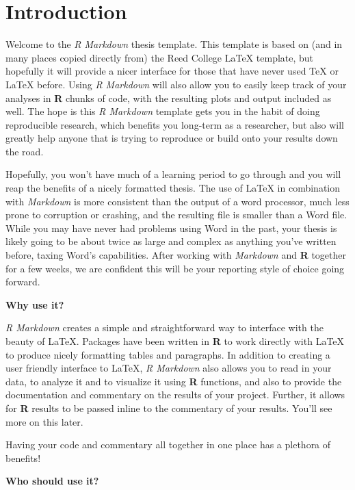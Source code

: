 \documentclass[12pt,twoside]{dukestatscithesis}
\theoremstyle{definition}
\theoremstyle{definition}
\theoremstyle{definition}
\theoremstyle{remark}
\begin{document}
\chapter*{Introduction}\label{introduction}

Welcome to the \emph{R Markdown} thesis template. This template is based
on (and in many places copied directly from) the Reed College LaTeX
template, but hopefully it will provide a nicer interface for those that
have never used TeX or LaTeX before. Using \emph{R Markdown} will also
allow you to easily keep track of your analyses in \textbf{R} chunks of
code, with the resulting plots and output included as well. The hope is
this \emph{R Markdown} template gets you in the habit of doing
reproducible research, which benefits you long-term as a researcher, but
also will greatly help anyone that is trying to reproduce or build onto
your results down the road.

Hopefully, you won't have much of a learning period to go through and
you will reap the benefits of a nicely formatted thesis. The use of
LaTeX in combination with \emph{Markdown} is more consistent than the
output of a word processor, much less prone to corruption or crashing,
and the resulting file is smaller than a Word file. While you may have
never had problems using Word in the past, your thesis is likely going
to be about twice as large and complex as anything you've written
before, taxing Word's capabilities. After working with \emph{Markdown}
and \textbf{R} together for a few weeks, we are confident this will be
your reporting style of choice going forward.

\textbf{Why use it?}

\emph{R Markdown} creates a simple and straightforward way to interface
with the beauty of LaTeX. Packages have been written in \textbf{R} to
work directly with LaTeX to produce nicely formatting tables and
paragraphs. In addition to creating a user friendly interface to LaTeX,
\emph{R Markdown} also allows you to read in your data, to analyze it
and to visualize it using \textbf{R} functions, and also to provide the
documentation and commentary on the results of your project. Further, it
allows for \textbf{R} results to be passed inline to the commentary of
your results. You'll see more on this later.

Having your code and commentary all together in one place has a plethora
of benefits!

\textbf{Who should use it?}
\end{document}
